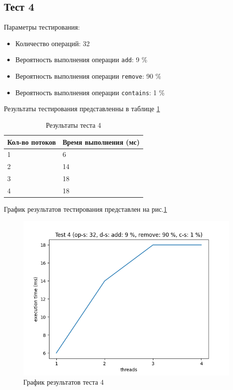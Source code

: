 \subsection*{Тест 4}

Параметры тестирования:

\begin{itemize}
    \item Количество операций: 32
    \item Вероятность выполнения операции \verb|add|: 9 \%
    \item Вероятность выполнения операции \verb|remove|: 90 \%
    \item Вероятность выполнения операции \verb|contains|: 1 \%
\end{itemize}

Результаты тестирования представленны в таблице \ref{tab:results4}


\begin{table}[H]
    \centering
    \begin{tabular}{|l|l|}
        \hline
        Кол-во потоков & Время выполнения (мс) \\
        \hline
        1 & 6 \\
        \hline
        2 & 14 \\
        \hline
        3 & 18 \\
        \hline
        4 & 18 \\
        \hline
    \end{tabular}
    \caption{Результаты теста 4}
    \label{tab:results4}
\end{table}
        

График результатов тестирования представлен на рис.\ref{fig:plot4}

\begin{figure}[H]
    \centering
    \includegraphics[width=0.7\linewidth]{photo/plot4}
    \caption{График результатов теста 4}
    \label{fig:plot4}
\end{figure}

